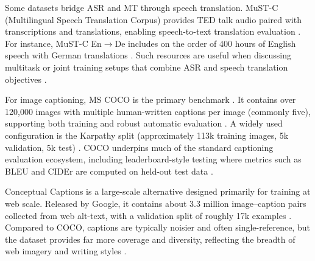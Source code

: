 Some datasets bridge ASR and MT through speech translation. MuST-C (Multilingual Speech Translation Corpus) provides TED talk audio paired with transcriptions and translations, enabling speech-to-text translation evaluation \cite{diagangi2019mustc}. For instance, MuST-C En$\rightarrow$De includes on the order of 400 hours of English speech with German translations \cite{diagangi2019mustc}. Such resources are useful when discussing multitask or joint training setups that combine ASR and speech translation objectives \cite{radford2023whisper,nvidia2024lessismore}.

For image captioning, MS COCO is the primary benchmark \cite{lin2014coco}. It contains over 120,000 images with multiple human-written captions per image (commonly five), supporting both training and robust automatic evaluation \cite{chen2015cococaptions}. A widely used configuration is the Karpathy split (approximately 113k training images, 5k validation, 5k test) \cite{karpathy2015deep}. COCO underpins much of the standard captioning evaluation ecosystem, including leaderboard-style testing where metrics such as BLEU and CIDEr are computed on held-out test data \cite{chen2015cococaptions}.

Conceptual Captions is a large-scale alternative designed primarily for training at web scale. Released by Google, it contains about 3.3 million image--caption pairs collected from web alt-text, with a validation split of roughly 17k examples \cite{sharma2018conceptual,conceptualcaptionsgithub}. Compared to COCO, captions are typically noisier and often single-reference, but the dataset provides far more coverage and diversity, reflecting the breadth of web imagery and writing styles \cite{sharma2018conceptual}.